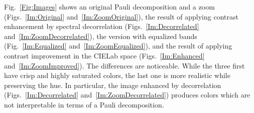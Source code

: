 \documentclass{article}
\begin{document}
Fig.~\ref{Fig:Images} shows an original Pauli decomposition and a zoom (Figs.~\ref{Im:Original} and~\ref{Im:ZoomOriginal}),
the result of applying contrast enhancement by spectral decorrelation (Figs.~\ref{Im:Decorrelated} and~\ref{Im:ZoomDecorrelated}),
the version with equalized bands (Fig.~\ref{Im:Equalized} and~\ref{Im:ZoomEqualized}),
and the result of applying contrast improvement in the CIELab space (Figs.~\ref{Im:Enhanced} and~\ref{Im:ZoomImproved}).
The differences are noticeable.
While the three first have crisp and highly saturated colors, the last one is more realistic while preserving the hue.
In particular, the image enhanced by decorrelation (Figs.~\ref{Im:Decorrelated} and~\ref{Im:ZoomDecorrelated}) produces colors which are not interpretable in terms of a Pauli decomposition.

\begin{figure}[hbt]
\centering
{}

\end{figure}
\end{document}
